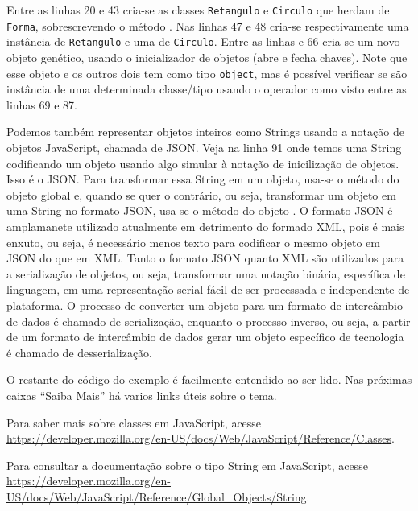 Entre as linhas 20 e 43 cria-se as classes \texttt{Retangulo} e \texttt{Circulo} que herdam de \texttt{Forma}, sobrescrevendo o método . Nas linhas 47 e 48 cria-se respectivamente uma instância de \texttt{Retangulo} e uma de \texttt{Circulo}. Entre as linhas e 66 cria-se um novo objeto genético, usando o inicializador de objetos (abre e fecha chaves). Note que esse objeto e os outros dois tem como tipo \texttt{object}, mas é possível verificar se são instância de uma determinada classe/tipo usando o operador  como visto entre as linhas 69 e 87.

Podemos também representar objetos inteiros como Strings usando a notação de objetos JavaScript, chamada de JSON. Veja na linha 91 onde temos uma String codificando um objeto usando algo simular à notação de inicilização de objetos. Isso é o JSON. Para transformar essa String em um objeto, usa-se o método  do objeto global  e, quando se quer o contrário, ou seja, transformar um objeto em uma String no formato JSON, usa-se o método  do objeto . O formato JSON é amplamanete utilizado atualmente em detrimento do formado XML, pois é mais enxuto, ou seja, é necessário menos texto para codificar o mesmo objeto em JSON do que em XML. Tanto o formato JSON quanto XML são utilizados para a serialização de objetos, ou seja, transformar uma notação binária, específica de linguagem, em uma representação serial fácil de ser processada e independente de plataforma. O processo de converter um objeto para um formato de intercâmbio de dados é chamado de serialização, enquanto o processo inverso, ou seja, a partir de um formato de intercâmbio de dados gerar um objeto específico de tecnologia é chamado de desserialização.

O restante do código do exemplo é facilmente entendido ao ser lido. Nas próximas caixas ``Saiba Mais'' há varios links úteis sobre o tema.

\begin{saibaMais}
    Para saber mais sobre classes em JavaScript, acesse \url{https://developer.mozilla.org/en-US/docs/Web/JavaScript/Reference/Classes}.
\end{saibaMais}

\begin{saibaMais}
    Para consultar a documentação sobre o tipo String em JavaScript, acesse \url{https://developer.mozilla.org/en-US/docs/Web/JavaScript/Reference/Global_Objects/String}.
\end{saibaMais}


